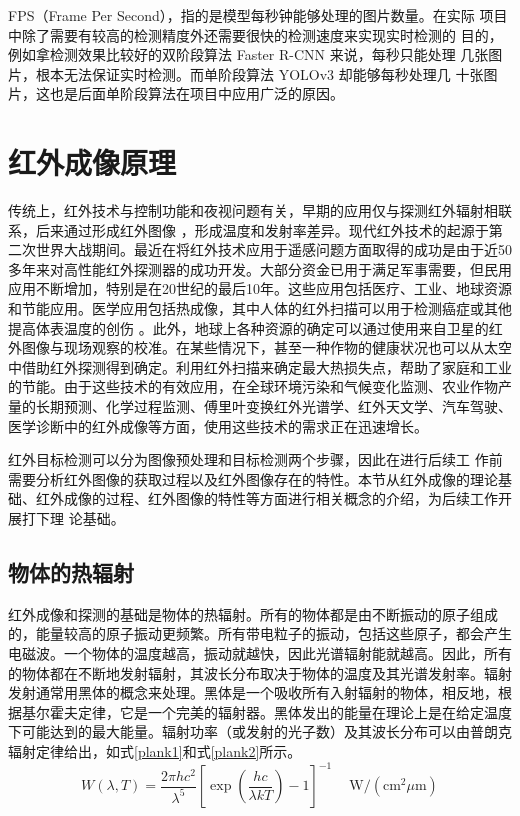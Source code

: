 FPS（Frame Per Second），指的是模型每秒钟能够处理的图片数量。在实际
项目中除了需要有较高的检测精度外还需要很快的检测速度来实现实时检测的
目的，例如拿检测效果比较好的双阶段算法 Faster R-CNN 来说，每秒只能处理
几张图片，根本无法保证实时检测。而单阶段算法 YOLOv3 却能够每秒处理几
十张图片，这也是后面单阶段算法在项目中应用广泛的原因。

\section{红外成像原理}
传统上，红外技术与控制功能和夜视问题有关，早期的应用仅与探测红外辐射相联系，后来通过形成红外图像
，形成温度和发射率差异\cite{rogalski2002infrared}。现代红外技术的起源于第二次世界大战期间。最近在将红外技术应用于遥感问题方面取得的成功是由于近50多年来对高性能红外探测器的成功开发。大部分资金已用于满足军事需要，但民用应用不断增加，特别是在20世纪的最后10年。这些应用包括医疗、工业、地球资源和节能应用。医学应用包括热成像，其中人体的红外扫描可以用于检测癌症或其他提高体表温度的创伤
。此外，地球上各种资源的确定可以通过使用来自卫星的红外图像与现场观察的校准。在某些情况下，甚至一种作物的健康状况也可以从太空中借助红外探测得到确定。利用红外扫描来确定最大热损失点，帮助了家庭和工业的节能。由于这些技术的有效应用，在全球环境污染和气候变化监测、农业作物产量的长期预测、化学过程监测、傅里叶变换红外光谱学、红外天文学、汽车驾驶、医学诊断中的红外成像等方面，使用这些技术的需求正在迅速增长。

红外目标检测可以分为图像预处理和目标检测两个步骤，因此在进行后续工
作前需要分析红外图像的获取过程以及红外图像存在的特性。本节从红外成像的理论基础、红外成像的过程、红外图像的特性等方面进行相关概念的介绍，为后续工作开展打下理
论基础。
\subsection{物体的热辐射}
红外成像和探测的基础是物体的热辐射。所有的物体都是由不断振动的原子组成的，能量较高的原子振动更频繁。所有带电粒子的振动，包括这些原子，都会产生电磁波。一个物体的温度越高，振动就越快，因此光谱辐射能就越高。因此，所有的物体都在不断地发射辐射，其波长分布取决于物体的温度及其光谱发射率。辐射发射通常用黑体的概念来处理。黑体是一个吸收所有入射辐射的物体，相反地，根据基尔霍夫定律，它是一个完美的辐射器。黑体发出的能量在理论上是在给定温度下可能达到的最大能量。辐射功率（或发射的光子数）及其波长分布可以由普朗克辐射定律给出，如式\ref{plank1}和式\ref{plank2}所示。
\begin{equation}
    W(\lambda, T)=\frac{2 \pi h c^{2}}{\lambda^{5}}\left[\exp \left(\frac{h c}{\lambda k T}\right)-1\right]^{-1} \quad \mathrm{~W} /\left(\mathrm{cm}^{2} \mu \mathrm{m}\right)
    \label{plank1}
\end{equation}

